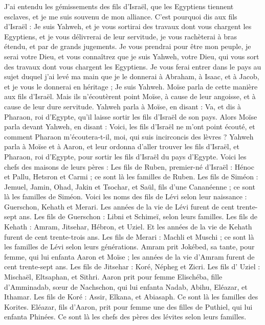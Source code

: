 \begin{multicols}{2}
J'ai entendu les gémissements des fils d'Israël, que les Egyptiens tiennent esclaves, et je me suis souvenu de mon alliance.
C'est pourquoi dis aux fils d'Israël : Je suis Yahweh, et je vous sortirai des travaux dont vous chargent les Egyptiens, et je vous délivrerai de leur servitude, je vous rachèterai à bras étendu, et par de grands jugements.
Je vous prendrai pour être mon peuple, je serai votre Dieu, et vous connaîtrez que je suis Yahweh, votre Dieu, qui vous sort des travaux dont vous chargent les Egyptiens.
Je vous ferai entrer dans le pays au sujet duquel j’ai levé ma main que je le donnerai à Abraham, à Isaac, et à Jacob, et je vous le donnerai en héritage ; Je suis Yahweh.
Moïse parla de cette manière aux fils d'Israël. Mais ils n'écoutèrent point Moïse, à cause de leur angoisse, et à cause de leur dure servitude.
Yahweh parla à Moïse, en disant :
Va, et dis à Pharaon, roi d'Egypte, qu'il laisse sortir les fils d'Israël de son pays.
Alors Moïse parla devant Yahweh, en disant : Voici, les fils d'Israël ne m'ont point écouté, et comment Pharaon m'écoutera-t-il, moi, qui suis incirconcis des lèvres ?
Yahweh parla à Moïse et à Aaron, et leur ordonna d'aller trouver les fils d'Israël, et Pharaon, roi d'Egypte, pour sortir les fils d'Israël du pays d'Egypte.
Voici les chefs des maisons de leurs pères : Les fils de Ruben, premier-né d'Israël : Hénoc et Pallu, Hetsron et Carmi ; ce sont là les familles de Ruben\FTNT{}.
Les fils de Siméon : Jemuel, Jamin, Ohad, Jakin et Tsochar, et Saül, fils d'une Cananéenne ; ce sont là les familles de Siméon.
Voici les noms des fils de Lévi selon leur naissance : Guerschon, Kehath et Merari. Les années de la vie de Lévi furent de cent trente-sept ans.
Les fils de Guerschon : Libni et Schimeï, selon leurs familles.
Les fils de Kehath : Amram, Jitsehar, Hébron, et Uziel. Et les années de la vie de Kehath furent de cent trente-trois ans.
Les fils de Merari : Machli et Muschi ; ce sont là les familles de Lévi selon leurs générations.
Amram prit Jokébed, sa tante, pour femme, qui lui enfanta Aaron et Moïse ; les années de la vie d’Amram furent de cent trente-sept ans.
Les fils de Jitsehar : Koré, Népheg et Zicri.
Les fils d’ Uziel : Mischaël, Eltsaphan, et Sithri.
Aaron prit pour femme Elischéba, fille d’Amminadab, sœur de Nachschon, qui lui enfanta Nadab, Abihu, Eléazar, et Ithamar.
Les fils de Koré : Assir, Elkana, et Abiasaph. Ce sont là les familles des Korites.
Eléazar, fils d'Aaron, prit pour femme une des filles de Puthiel, qui lui enfanta Phinées. Ce sont là les chefs des pères des lévites selon leurs familles.

\end{multicols}
